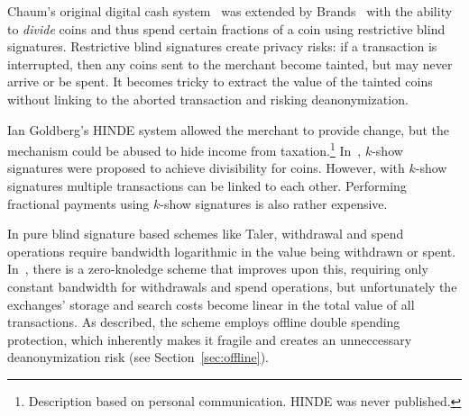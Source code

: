 \documentclass{llncs}
\begin{document}
Chaum's original digital cash system~\cite{chaum1983blind} was
extended by Brands~\cite{brands1993efficient} with the ability to {\em
  divide} coins and thus spend certain fractions of a coin using
restrictive blind signatures.  Restrictive blind signatures create
privacy risks: if a transaction is interrupted, then any coins sent
to the merchant become tainted, but may never arrive or be spent.
It becomes tricky to extract the value of the tainted coins without
linking to the aborted transaction and risking deanonymization.

Ian Goldberg's HINDE system allowed the merchant to provide change,
but the mechanism could be abused to hide income from
taxation.\footnote{Description based on personal communication. HINDE
  was never published.}
In~\cite{brands1993efficient}, $k$-show signatures were proposed to
achieve divisibility for coins.  However, with $k$-show signatures
multiple transactions can be linked to each other.
Performing fractional payments using $k$-show signatures is also
rather expensive.

In pure blind signature based schemes like Taler, withdrawal and spend
operations require bandwidth logarithmic in the value being withdrawn
or spent.  In~\cite{Camenisch05compacte-cash}, there is a zero-knoledge
scheme that improves upon this, requiring only constant bandwidth for
withdrawals and spend operations, but unfortunately the exchanges' storage and
search costs become linear in the total value of all transactions.
As described, the scheme employs offline double spending protection,
which inherently makes it fragile and creates an unneccessary
deanonymization risk (see Section~\ref{sec:offline}).
%
%
\end{document}
